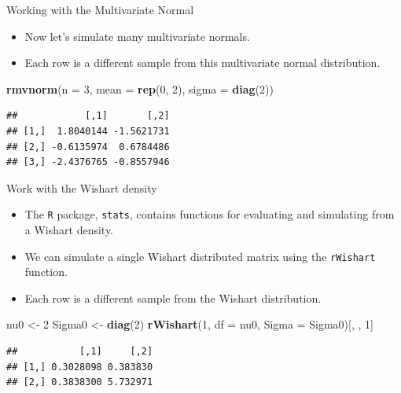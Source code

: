 \documentclass[
  ignorenonframetext,
]{beamer}
\newenvironment{Shaded}{\begin{snugshade}}{\end{snugshade}}
\newcommand{\DataTypeTok}[1]{\textcolor[rgb]{0.13,0.29,0.53}{#1}}
\newcommand{\DecValTok}[1]{\textcolor[rgb]{0.00,0.00,0.81}{#1}}
\newcommand{\KeywordTok}[1]{\textcolor[rgb]{0.13,0.29,0.53}{\textbf{#1}}}
\newcommand{\NormalTok}[1]{#1}
\newcommand{\StringTok}[1]{\textcolor[rgb]{0.31,0.60,0.02}{#1}}
\providecommand{\tightlist}{%
  \setlength{\itemsep}{0pt}\setlength{\parskip}{0pt}}
\begin{document}
\begin{frame}[fragile]{Working with the Multivariate Normal}
\protect\hypertarget{working-with-the-multivariate-normal}{}

\begin{itemize}
\tightlist
\item
  Now let's simulate many multivariate normals.
\item
  Each row is a different sample from this multivariate normal
  distribution.
\end{itemize}

\begin{Shaded}
\begin{Highlighting}[]
\KeywordTok{rmvnorm}\NormalTok{(}\DataTypeTok{n =} \DecValTok{3}\NormalTok{, }\DataTypeTok{mean =} \KeywordTok{rep}\NormalTok{(}\DecValTok{0}\NormalTok{, }\DecValTok{2}\NormalTok{), }\DataTypeTok{sigma =} \KeywordTok{diag}\NormalTok{(}\DecValTok{2}\NormalTok{))}
\end{Highlighting}
\end{Shaded}

\begin{verbatim}
##            [,1]       [,2]
## [1,]  1.8040144 -1.5621731
## [2,] -0.6135974  0.6784486
## [3,] -2.4376765 -0.8557946
\end{verbatim}

\end{frame}

\begin{frame}[fragile]{Work with the Wishart density}
\protect\hypertarget{work-with-the-wishart-density}{}

\begin{itemize}
\item
  The \texttt{R} package, \texttt{stats}, contains functions for
  evaluating and simulating from a Wishart density.
\item
  We can simulate a single Wishart distributed matrix using the
  \texttt{rWishart} function.
\item
  Each row is a different sample from the Wishart distribution.
\end{itemize}

\begin{Shaded}
\begin{Highlighting}[]
\NormalTok{nu0 <-}\StringTok{ }\DecValTok{2}
\NormalTok{Sigma0 <-}\StringTok{ }\KeywordTok{diag}\NormalTok{(}\DecValTok{2}\NormalTok{)}
\KeywordTok{rWishart}\NormalTok{(}\DecValTok{1}\NormalTok{, }\DataTypeTok{df =}\NormalTok{ nu0, }\DataTypeTok{Sigma =}\NormalTok{ Sigma0)[, , }\DecValTok{1}\NormalTok{]}
\end{Highlighting}
\end{Shaded}

\begin{verbatim}
##           [,1]     [,2]
## [1,] 0.3028098 0.383830
## [2,] 0.3838300 5.732971
\end{verbatim}

\end{frame}
\end{document}
